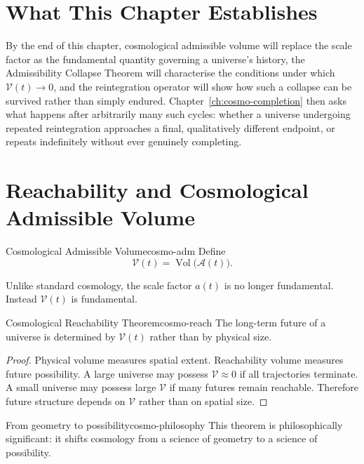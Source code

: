 \documentclass[12pt,twoside,openright]{book}
\newcommand{\Vol}{\operatorname{Vol}}
\begin{document}
\section{What This Chapter Establishes}
\label{sec:ch18-preview}

By the end of this chapter, cosmological admissible volume
will replace the scale factor as the fundamental quantity
governing a universe's history, the Admissibility Collapse
Theorem will characterise the conditions under which
$\mathcal{V}(t)\to0$, and the reintegration operator will show
how such a collapse can be survived rather than simply
endured. Chapter~\ref{ch:cosmo-completion} then asks what
happens after arbitrarily many such cycles: whether a universe
undergoing repeated reintegration approaches a final,
qualitatively different endpoint, or repeats indefinitely
without ever genuinely completing.

\section{Reachability and Cosmological Admissible Volume}
\label{sec:ch18-replaces-defs}

\begin{definition}{Cosmological Admissible Volume}{cosmo-adm}
  Define
  \[
    \mathcal{V}(t) = \Vol\bigl(\mathcal{A}(t)\bigr).
  \]
\end{definition}

Unlike standard cosmology, the scale factor $a(t)$ is no
longer fundamental. Instead $\mathcal{V}(t)$ is fundamental.

\begin{theorem}{Cosmological Reachability Theorem}{cosmo-reach}
  The long-term future of a universe is determined by
  $\mathcal{V}(t)$ rather than by physical size.
\end{theorem}

\begin{proof}
  Physical volume measures spatial extent. Reachability
  volume measures future possibility. A large universe may
  possess $\mathcal{V} \approx 0$ if all trajectories
  terminate. A small universe may possess large
  $\mathcal{V}$ if many futures remain reachable. Therefore
  future structure depends on $\mathcal{V}$ rather than on
  spatial size.
\end{proof}

\begin{remark}{From geometry to possibility}{cosmo-philosophy}
  This theorem is philosophically significant: it shifts
  cosmology from a science of geometry to a science of
  possibility.
\end{remark}
\end{document}
